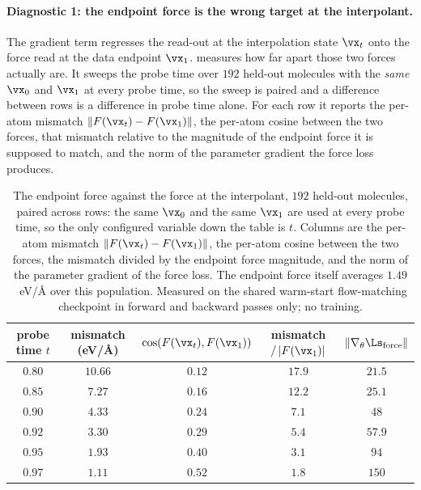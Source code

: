 \paragraph{Diagnostic 1: the endpoint force is the wrong target at the interpolant.} The
gradient term regresses the read-out at the interpolation state $\vx_t$ onto the force
read at the data endpoint $\vx_1$.  measures how far apart those
two forces actually are. It sweeps the probe time over $192$ held-out molecules with the
\emph{same} $\vx_0$ and $\vx_1$ at every probe time, so the sweep is paired and a
difference between rows is a difference in probe time alone. For each row it reports the
per-atom mismatch $\|F(\vx_t) - F(\vx_1)\|$, the per-atom cosine between the two forces,
that mismatch relative to the magnitude of the endpoint force it is supposed to match,
and the norm of the parameter gradient the force loss produces.

\begin{table}[h]
\caption{The endpoint force against the force at the interpolant, $192$ held-out
molecules, paired across rows: the same $\vx_0$ and the same $\vx_1$ are used at every
probe time, so the only configured variable down the table is $t$. Columns are the
per-atom mismatch $\|F(\vx_t)-F(\vx_1)\|$, the per-atom cosine between the two forces,
the mismatch divided by the endpoint force magnitude, and the norm of the parameter
gradient of the force loss. The endpoint force itself averages $1.49$~eV/\AA{} over this
population. Measured on the shared warm-start flow-matching checkpoint in forward and
backward passes only; no training.}
\label{tab:forcemismatch}
\begin{center}
\footnotesize
\begin{tabular}{ccccc}
\toprule
probe time $t$ & mismatch (eV/\AA) & $\cos(F(\vx_t),F(\vx_1))$ & mismatch $/\,|F(\vx_1)|$ & $\|\nabla_\theta \Ls_{\mathrm{force}}\|$ \\
\midrule
$0.80$ & $10.66$ & $0.12$ & $17.9$ & $21.5$ \\
$0.85$ & $7.27$  & $0.16$ & $12.2$ & $25.1$ \\
$0.90$ & $4.33$  & $0.24$ & $7.1$  & $48$ \\
$0.92$ & $3.30$  & $0.29$ & $5.4$  & $57.9$ \\
$0.95$ & $1.93$  & $0.40$ & $3.1$  & $94$ \\
$0.97$ & $1.11$  & $0.52$ & $1.8$  & $150$ \\
\bottomrule
\end{tabular}
\end{center}
\end{table}

